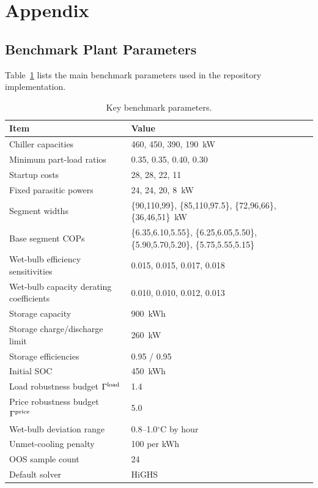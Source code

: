\section{Appendix}

\subsection{Benchmark Plant Parameters}

Table~\ref{tab:params} lists the main benchmark parameters used in the repository implementation.

\begin{table}[H]
\centering
\caption{Key benchmark parameters.}
\label{tab:params}
\begin{tabular}{ll}
\toprule
Item & Value \\
\midrule
Chiller capacities & 460, 450, 390, 190~kW \\
Minimum part-load ratios & 0.35, 0.35, 0.40, 0.30 \\
Startup costs & 28, 28, 22, 11 \\
Fixed parasitic powers & 24, 24, 20, 8~kW \\
Segment widths & \{90,110,99\}, \{85,110,97.5\}, \{72,96,66\}, \{36,46,51\}~kW \\
Base segment COPs & \{6.35,6.10,5.55\}, \{6.25,6.05,5.50\}, \{5.90,5.70,5.20\}, \{5.75,5.55,5.15\} \\
Wet-bulb efficiency sensitivities & 0.015, 0.015, 0.017, 0.018 \\
Wet-bulb capacity derating coefficients & 0.010, 0.010, 0.012, 0.013 \\
Storage capacity & 900~kWh \\
Storage charge/discharge limit & 260~kW \\
Storage efficiencies & 0.95 / 0.95 \\
Initial SOC & 450~kWh \\
Load robustness budget $\Gamma^{\mathrm{load}}$ & 1.4 \\
Price robustness budget $\Gamma^{\mathrm{price}}$ & 5.0 \\
Wet-bulb deviation range & 0.8--1.0$^\circ$C by hour \\
Unmet-cooling penalty & 100 per kWh \\
OOS sample count & 24 \\
Default solver & HiGHS \\
\bottomrule
\end{tabular}
\end{table}


